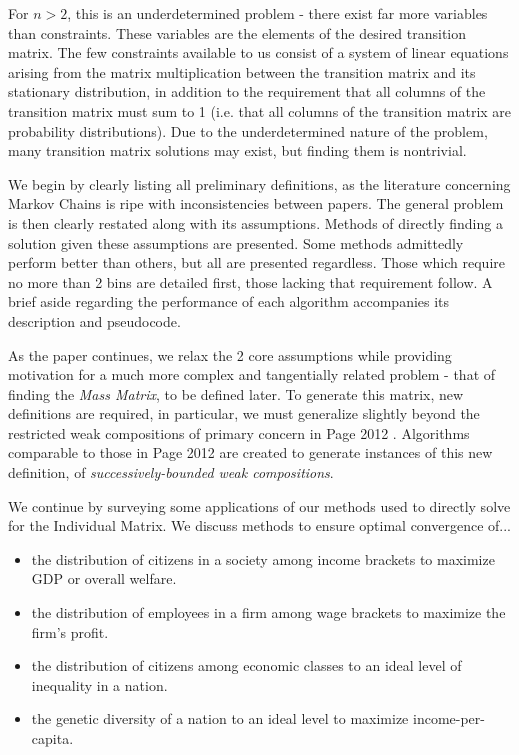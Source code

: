 \documentclass{article}
\begin{document}
For $n>2$, this is an underdetermined problem - there exist far more variables than constraints. These variables are the elements of the desired transition matrix. The few constraints available to us consist of a system of linear equations arising from the matrix multiplication between the transition matrix and its stationary distribution, in addition to the requirement that all columns of the transition matrix must sum to 1 (i.e. that all columns of the transition matrix are probability distributions). Due to the underdetermined nature of the problem, many transition matrix solutions may exist, but finding them is nontrivial.

We begin by clearly listing all preliminary definitions, as the literature concerning Markov Chains is ripe with inconsistencies between papers. The general problem is then clearly restated along with its assumptions. Methods of directly finding a solution given these assumptions are presented. Some methods admittedly perform better than others, but all are presented regardless. Those which require no more than 2 bins are detailed first, those lacking that requirement follow. A brief aside regarding the performance of each algorithm accompanies its description and pseudocode.

As the paper continues, we relax the 2 core assumptions while providing motivation for a much more complex and tangentially related problem - that of finding the \textit{Mass Matrix}, to be defined later. To generate this matrix, new definitions are required, in particular, we must generalize slightly beyond the restricted weak compositions of primary concern in Page 2012 \cite{Page2012}. Algorithms comparable to those in Page 2012 are created to generate instances of this new definition, of \textit{successively-bounded weak compositions}.

We continue by surveying some applications of our methods used to directly solve for the Individual Matrix. We discuss methods to ensure optimal convergence of...

\begin{itemize}
    \item the distribution of citizens in a society among income brackets to maximize GDP or overall welfare.
    \item the distribution of employees in a firm among wage brackets to maximize the firm's profit.
    \item the distribution of citizens among economic classes to an ideal level of inequality in a nation.
    \item the genetic diversity of a nation to an ideal level to maximize income-per-capita.
\end{itemize}
\end{document}
